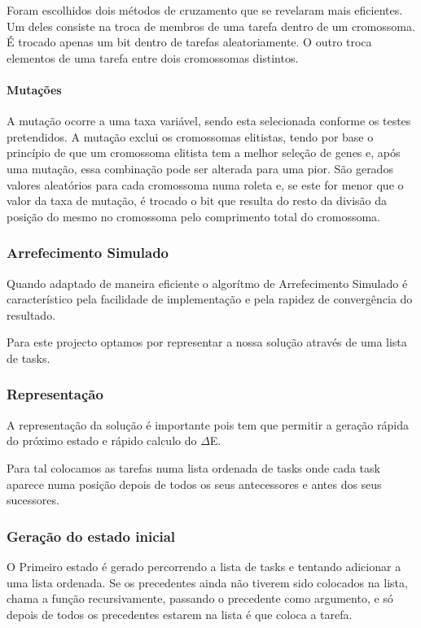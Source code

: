 \begin{titlepage}
Foram escolhidos dois métodos de cruzamento que se revelaram mais eficientes. Um deles consiste na troca de membros de uma tarefa dentro de um cromossoma. É trocado apenas um bit dentro de tarefas aleatoriamente. O outro troca elementos de uma tarefa entre dois cromossomas distintos.

\paragraph{Mutações}

A mutação ocorre a uma taxa variável, sendo esta selecionada conforme os testes pretendidos. A mutação exclui os cromossomas elitistas, tendo por base o princípio de que um cromossoma elitista tem a melhor seleção de genes e, após uma mutação, essa combinação pode ser alterada para uma pior. São gerados valores aleatórios para cada cromossoma numa roleta e, se este for menor que o valor da taxa de mutação, é trocado o bit que resulta do resto da divisão da posição do mesmo no cromossoma pelo comprimento total do cromossoma.


\subsubsection{Arrefecimento Simulado}
\justify\normalsize

Quando adaptado de maneira eficiente o algorítmo de Arrefecimento Simulado é característico pela facilidade de implementação e pela rapidez de convergência do resultado.

Para este projecto optamos por representar a nossa solução através de uma lista de tasks.

\subsubsection{Representação}
A representação da solução é importante pois tem que permitir a geração rápida do próximo estado e rápido calculo do 	$\Delta$E.

Para tal colocamos as tarefas numa lista ordenada de tasks onde cada task aparece numa posição depois de todos os seus antecessores e antes dos seus sucessores.

\subsubsection{Geração do estado inicial}
O Primeiro estado é gerado percorrendo a lista de tasks e tentando adicionar a uma lista ordenada. Se os precedentes ainda não tiverem sido colocados na lista, chama a função recursivamente, passando o precedente como argumento, e só depois de todos os precedentes estarem na lista é que coloca a tarefa.


\end{titlepage}
